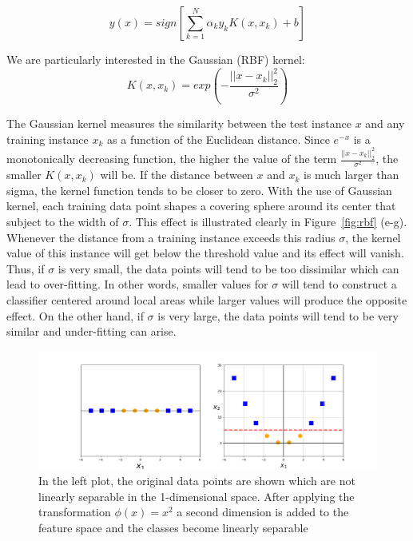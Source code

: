 \documentclass{article}
\begin{document}
\begin{equation}
y(x) = sign[\sum_{k=1}^{N}\alpha_ky_kK(x,x_k) +b ]
\end{equation}

We are particularly interested in the Gaussian (RBF) kernel:
\begin{equation}
K(x,x_k) = exp(-\frac{||x-x_k||^2_2}{\sigma^2})
\end{equation}

The Gaussian kernel measures the similarity between the test instance $x$ and any training instance $x_k$ as a function of the Euclidean distance. Since $e^{-x}$ is a monotonically decreasing function, the higher the value of the term $\frac{||x-x_k||^2_2}{\sigma^2}$, the smaller $K(x,x_k)$ will be. If the distance between $x$ and $x_k$ is much larger than sigma, the kernel function tends to be closer to zero. With the use of Gaussian kernel, each training data point shapes a covering sphere around its center that subject to the width of $\sigma$. This effect is illustrated clearly in Figure~\ref{fig:rbf} (e-g). Whenever the distance from a training instance exceeds this radius $\sigma$, the kernel value of this instance will get below the threshold value and its effect will vanish. Thus, if $\sigma$ is very small, the data points will tend to be too dissimilar which can lead to over-fitting. In other words, smaller values for $\sigma$ will tend to construct a classifier centered around local areas  while larger values will produce the opposite effect. On the other hand, if $\sigma$ is very large, the data points will tend to be very similar and under-fitting can arise. 

\begin{figure}[]

            \includegraphics[width=\linewidth]{example}
      
        \caption{ In the left plot, the original data points are shown which are not linearly separable in the 1-dimensional space. After applying the transformation $\phi(x)=x^2$ a second dimension is added to the feature space and the classes become linearly separable }        
        
              
        \label{fig:example}
    \end{figure}
\end{document}
